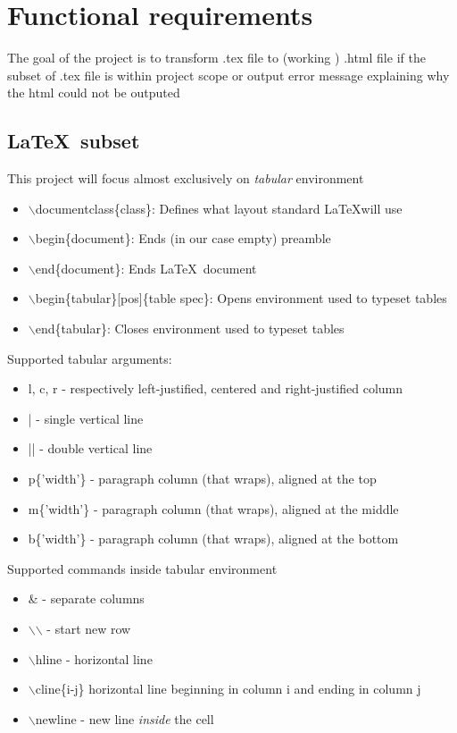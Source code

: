 \section{Functional requirements}
The goal of the project is to transform .tex file to (working ) .html file if the subset of .tex file is within project scope or output error message explaining why the html could not be outputed
\subsection{\LaTeX \, subset}
This project will focus almost exclusively on \emph{tabular} environment \\
\begin{itemize}
    \item $\backslash$documentclass\{class\}: Defines what layout standard \LaTeX will use 
    \item $\backslash$begin\{document\}: Ends (in our case empty) preamble
    \item $\backslash$end\{document\}: Ends \LaTeX \, document
    \item $\backslash$begin\{tabular\}[pos]\{table spec\}: Opens environment used to typeset tables 
    \item $\backslash$end\{tabular\}: Closes environment used to typeset tables 
\end{itemize}
Supported tabular arguments:
\begin{itemize}
    \item l, c, r - respectively left-justified, centered and right-justified column
    \item  | - single vertical line 
    \item  || - double vertical line 
    \item p\{'width'\} - paragraph column (that wraps), aligned at the top 
    \item m\{'width'\} - paragraph column (that wraps), aligned at the middle 
    \item b\{'width'\} - paragraph column (that wraps), aligned at the bottom 
\end{itemize}

Supported commands inside tabular environment
\begin{itemize}
    \item \& - separate columns
    \item $\backslash$$\backslash$ - start new row
    \item $\backslash$hline - horizontal line
    \item $\backslash$cline\{i-j\} horizontal line beginning in column i and ending in column j
    \item $\backslash$newline - new line \emph{inside} the cell
\end{itemize}
